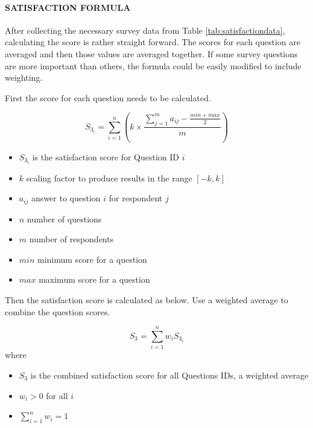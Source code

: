 \documentclass[SDSUThesis.tex]{subfiles}
\begin{document}
            \paragraph{SATISFACTION FORMULA}
                After collecting the necessary survey data from Table \ref{tab:satisfactiondata},
                calculating the score is rather straight forward.
                The scores for each question are averaged and then those
                values are averaged together.  If some survey questions
                are more important than others, the formula could be
                easily modified to include weighting.  
            
                First the score for each question needs to be calculated.
                
                \[
                    S_{3_i} = \sum^n_{i=1}\left( k \times \frac{ \sum^m_{j=1}a_{ij}-\frac{min + max}{2}}{m} \right)
                \]
                
                \begin{itemize}
                    \item $S_{3_i}$ is the satisfaction score for Question ID $i$
                    \item $k$ scaling factor to produce results in the range $[-k,k]$
                    \item $a_{ij}$ answer to question $i$ for respondent $j$
                    \item $n$ number of questions
                    \item $m$ number of respondents
                    \item $min$ minimum score for a question
                    \item $max$ maximum score for a question
                \end{itemize}
                
                Then the satisfaction score is calculated as below.  Use a weighted average
                to combine the question scores.
                
                \[
                    S_{3} = \sum\limits^n_{i=1} w_i S_{3_i}
                \]
                where
                \begin{itemize}
                    \item $S_3$ is the combined satisfaction score for all Questions IDs, 
                    a weighted average
                    \item $w_i > 0$ for all $i$
                    \item $\sum\limits^n_{i=1} w_i = 1$
                \end{itemize}
                
\end{document}
